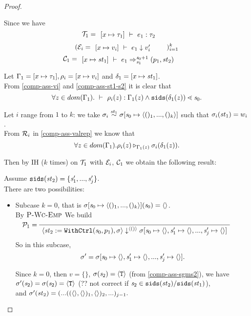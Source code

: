 \begin{proof}
\begin{itemize}
\begin{enumerate}[(i)]
	
	Since we have 
	$$\MT_1 = \PT{\AC{\Type{[x \|-> {\tau_1}]}{e_1}{\tau_2}}}$$
	$$(\ME_i = \PT{\AC{\Eval{[x \|-> {v_i}]}{e_1}{v_i'}}})^k_{i=1} $$
	$$\MC_1 = \PT{\AC{\Trans{[x \|-> {\st_1}]}{e_1}{\s_0+1}{\s_1}{\sfun{p_1}{\st_2}}}}$$
	
	Let $\Gam_1 = [x \|-> \tau_1], \rho_i= [x \|-> v_i]$ and $\del_1 = [x \|-> \st_1]$. \\
	From \eqref{comp-ass-vi} and \eqref{comp-ass-st1-s2} it is clear that 
	$$\forall z \in dom(\Gam_1). \Type{}{\rho_i(z)}{\Gam_1(z)} \wedge 
	\sids{\del_1(z)} \.< \s_0 .$$
	
	Let $i$ range from $1$ to $k$: we take $\sgm_i \~{\st_1} \sgm[\s_0 \|-> \<()_1,...,()_k \'>]$ 
	such that $\sigma_i(\mathit{st}_1)= w_i$. \\
	From $\mathcal{R}_i$ in \eqref{comp-ass-valrep} we know that  
	$$\forall z \in dom(\Gamma_1). \rho_i(z) \triangleright_{\Gamma_1(z)} \sigma_i(\delta_1(z)).$$
	
	
	Then  by IH ($k$ times) on $\mathcal{T}_1$ with $\mathcal{E}_i$, 
	$\mathcal{C}_1$ we obtain the following result:


	Assume $\mathtt{sids}(\mathit{st}_2) = \{\mathit{s}'_1,...,\mathit{s}'_j\}$.\\
	
	There are two possibilities:
	\begin{itemize}
	\item 
	Subcase $k=0$, that is $\sgmsz(\s_0) = \emptyv$.\\
	By $\textsc{P-Wc-Emp}$ We build
	$$\PT{
		\AC{}
		\LeLa{\MP_1 = }
		\UC{\seval{\withctrl{\s_0}{p_1}{\st_2}}{\sgm}{\< () \'>}
			{\sgm[\s_0 \|-> \emptyv, \s_1' \|-> \emptyv, ..., \s_j' \|-> \emptyv]}}
	  }$$ 
    So in this subcase, 
    $$\sgm' = \sgm[\s_0 \|-> \emptyv, \s_1' \|-> \emptyv, ..., \s_j' \|-> \emptyv].$$ 

\def\sgmpempty{\sgm[\s_0 \|-> \emptyv, \s_1' \|-> \emptyv, ..., \s_j' \|-> \emptyv]}

	Since $k=0$, then $v = \{ \}$, $\sigma(\mathit{s}_2) = \langle \mathtt{T} \rangle$ (from \eqref{comp-ass-sgms2}), we have \\
	{\color{red} $\sigma'(\mathit{s}_2) = \sigma(\mathit{s}_2) = \langle \mathtt{T} \rangle$ (?? not correct if $\mathit{s}_2 \in \mathtt{sids}(\mathit{st}_2)/\mathtt{sids}(\mathit{st}_1)$)}, \\
	and $\sigma'(\mathit{st}_2) = (...((\langle \rangle,\langle \rangle)_1,\langle \rangle)_2,...)_{j-1}.$ \\
	

\end{itemize}
\end{enumerate}
\end{itemize}
\end{proof}
